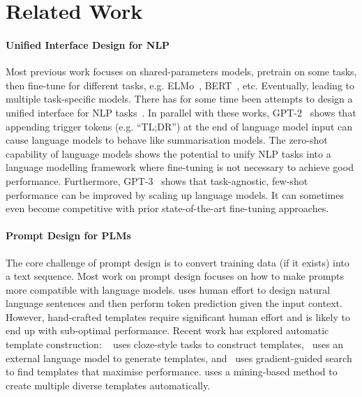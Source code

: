 \section{Related Work}

\paragraph{Unified Interface Design for NLP} Most previous work focuses on shared-parameters models, pretrain on some tasks, then fine-tune for different tasks, e.g. ELMo~\cite{peters2018deep}, BERT~\cite{devlin2019bert}, etc. Eventually, leading to multiple task-specific models. There has for some time been attempts to design a unified interface for NLP tasks~\cite{kumar2016ask, raffel2020exploring}. In parallel with these works, GPT-2~\cite{Radford2019LanguageMA} shows that appending trigger tokens (e.g. ``TL;DR'') at the end of language model input can cause language models to behave like summarisation models. The zero-shot capability of language models shows the potential to unify NLP tasks into a language modelling framework where fine-tuning is not necessary to achieve good performance. Furthermore, GPT-3~\cite{brown2020language} shows that task-agnostic, few-shot performance can be improved by scaling up language models. It can sometimes even become competitive with prior state-of-the-art fine-tuning approaches.

\paragraph{Prompt Design for PLMs} The core challenge of prompt design is to convert training data (if it exists) into a text sequence. Most work on prompt design focuses on how to make prompts more compatible with language models. \citet{petroni-etal-2019-language} uses human effort to design natural language sentences and then perform token prediction given the input context. However, hand-crafted templates require significant human effort and is likely to end up with sub-optimal performance. Recent work has explored automatic template construction: ~\citet{schick2020pet} uses cloze-style tasks to construct templates,~\citet{gao2020making} uses an external language model to generate templates, and~\citet{shin2020autoprompt} uses gradient-guided search to find templates that maximise performance. \citet{jiang2020can} uses a mining-based method to create multiple diverse templates automatically. 

